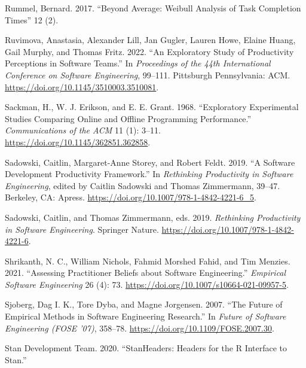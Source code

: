\documentclass[
]{article}
\newlength{\cslhangindent}
\newenvironment{CSLReferences}[2] %
 {\begin{list}{}{%
  \setlength{\itemindent}{0pt}
  \setlength{\leftmargin}{0pt}
  \setlength{\parsep}{0pt}
  \ifodd #1
   \setlength{\leftmargin}{\cslhangindent}
   \setlength{\itemindent}{-1\cslhangindent}
  \fi
  \setlength{\itemsep}{#2\baselineskip}}}
 {\end{list}}
\begin{document}
\begin{CSLReferences}{1}{0}
Rummel, Bernard. 2017. {``Beyond {Average}: {Weibull Analysis} of {Task
Completion Times}''} 12 (2).

Ruvimova, Anastasia, Alexander Lill, Jan Gugler, Lauren Howe, Elaine
Huang, Gail Murphy, and Thomas Fritz. 2022. {``An Exploratory Study of
Productivity Perceptions in Software Teams.''} In \emph{Proceedings of
the 44th {International Conference} on {Software Engineering}}, 99--111.
Pittsburgh Pennsylvania: ACM.
\url{https://doi.org/10.1145/3510003.3510081}.

Sackman, H., W. J. Erikson, and E. E. Grant. 1968. {``Exploratory
Experimental Studies Comparing Online and Offline Programming
Performance.''} \emph{Communications of the ACM} 11 (1): 3--11.
\url{https://doi.org/10.1145/362851.362858}.

Sadowski, Caitlin, Margaret-Anne Storey, and Robert Feldt. 2019. {``A
{Software Development Productivity Framework}.''} In \emph{Rethinking
{Productivity} in {Software Engineering}}, edited by Caitlin Sadowski
and Thomas Zimmermann, 39--47. Berkeley, CA: Apress.
\url{https://doi.org/10.1007/978-1-4842-4221-6_5}.

Sadowski, Caitlin, and Thomas Zimmermann, eds. 2019. \emph{Rethinking
{Productivity} in {Software Engineering}}. Springer Nature.
\url{https://doi.org/10.1007/978-1-4842-4221-6}.

Shrikanth, N. C., William Nichols, Fahmid Morshed Fahid, and Tim
Menzies. 2021. {``Assessing Practitioner Beliefs about Software
Engineering.''} \emph{Empirical Software Engineering} 26 (4): 73.
\url{https://doi.org/10.1007/s10664-021-09957-5}.

Sjoberg, Dag I. K., Tore Dyba, and Magne Jorgensen. 2007. {``The
{Future} of {Empirical Methods} in {Software Engineering Research}.''}
In \emph{Future of {Software Engineering} ({FOSE} '07)}, 358--78.
\url{https://doi.org/10.1109/FOSE.2007.30}.

Stan Development Team. 2020. {``{StanHeaders}: {Headers} for the {R}
Interface to {Stan}.''}


\end{CSLReferences}
\end{document}
